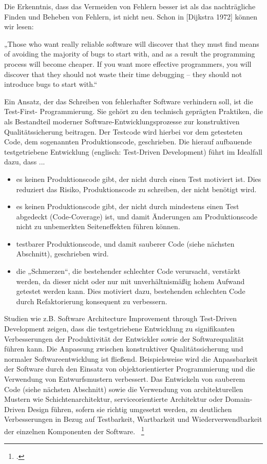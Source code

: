 Die Erkenntnis, dass das Vermeiden von Fehlern besser ist als das nachträgliche Finden
und Beheben von Fehlern, ist nicht neu. Schon in [Dijkstra 1972] können wir lesen:

„Those who want really reliable software will discover that they must find means of
avoiding the majority of bugs to start with, and as a result the programming process
will become cheaper. If you want more effective programmers, you will discover that
they should not waste their time debugging – they should not introduce bugs to start
with.“

Ein Ansatz, der das Schreiben von fehlerhafter Software verhindern soll, ist die Test-First-
Programmierung. Sie gehört zu den technisch geprägten Praktiken, die als Bestandteil moderner 
Software-Entwicklungsprozesse zur konstruktiven Qualitätssicherung beitragen.
Der Testcode wird hierbei vor dem getesteten Code, dem sogenannten Produktionscode,
geschrieben. Die hierauf aufbauende testgetriebene Entwicklung (englisch: Test-Driven
Development) führt im Idealfall dazu, dass ...
\begin{itemize}
    \item es keinen Produktionscode gibt, der nicht durch einen Test motiviert ist. Dies reduziert das Risiko, Produktionscode zu schreiben, der nicht benötigt wird.

    \item es keinen Produktionscode gibt, der nicht durch mindestens einen Test abgedeckt (Code-Coverage) ist, und damit Änderungen am Produktionscode nicht zu unbemerkten Seiteneffekten führen können.

    \item testbarer Produktionscode, und damit sauberer Code (siehe nächsten Abschnitt), geschrieben wird.

    \item die „Schmerzen“, die bestehender schlechter Code verursacht, verstärkt werden, da dieser nicht oder nur mit unverhältnismäßig hohem Aufwand getestet werden kann. Dies motiviert dazu, bestehenden schlechten Code durch Refaktorierung konsequent zu verbessern.
\end{itemize}

Studien wie z.B. \dq{}Software Architecture Improvement through Test-Driven Development\dq{} zeigen, dass die testgetriebene 
Entwicklung zu signifikanten Verbesserungen der Produktivität der Entwickler sowie der Softwarequalität führen kann. 
Die Anpassung zwischen konstruktiver Qualitätssicherung und normaler Softwareentwicklung ist fließend. Beispielsweise wird die Anpassbarkeit 
der Software durch den Einsatz von objektorientierter Programmierung und die Verwendung von 
Entwurfsmustern verbessert. Das Entwickeln von sauberem Code (siehe nächsten Abschnitt) sowie die Verwendung 
von architekturellen Mustern wie Schichtenarchitektur, serviceorientierte Architektur oder Domain-Driven Design 
führen, sofern sie richtig umgesetzt werden, zu deutlichen Verbesserungen in Bezug auf Testbarkeit, Wartbarkeit 
und Wiederverwendbarkeit der einzelnen Komponenten der Software. ~\footcite[Vgl.]{Janzen.2006}

